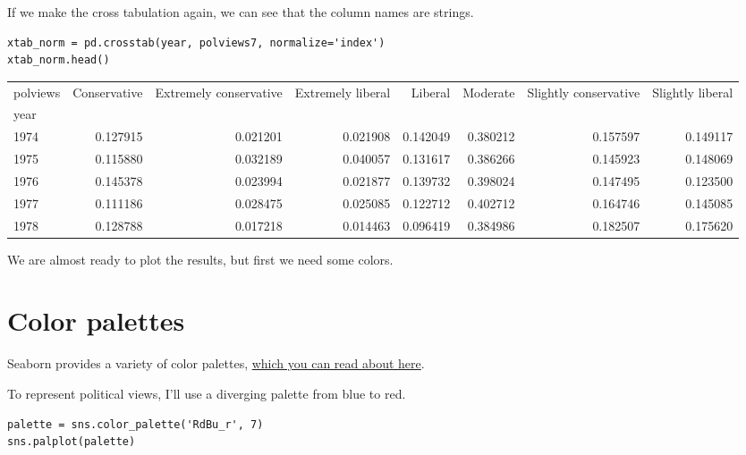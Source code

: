 If we make the cross tabulation again, we can see that the column names
are strings.

\begin{lstlisting}[]
xtab_norm = pd.crosstab(year, polviews7, normalize='index')
xtab_norm.head()
\end{lstlisting}

\begin{tabular}{lrrrrrrr}
\midrule
polviews &  Conservative &  Extremely conservative &  Extremely liberal &   Liberal &  Moderate &  Slightly conservative &  Slightly liberal \\
year &               &                         &                    &           &           &                        &                   \\
\midrule
1974 &      0.127915 &                0.021201 &           0.021908 &  0.142049 &  0.380212 &               0.157597 &          0.149117 \\
1975 &      0.115880 &                0.032189 &           0.040057 &  0.131617 &  0.386266 &               0.145923 &          0.148069 \\
1976 &      0.145378 &                0.023994 &           0.021877 &  0.139732 &  0.398024 &               0.147495 &          0.123500 \\
1977 &      0.111186 &                0.028475 &           0.025085 &  0.122712 &  0.402712 &               0.164746 &          0.145085 \\
1978 &      0.128788 &                0.017218 &           0.014463 &  0.096419 &  0.384986 &               0.182507 &          0.175620 \\
\midrule
\end{tabular}

We are almost ready to plot the results, but first we need some colors.

\hypertarget{color-palettes}{%
\section{Color palettes}\label{color-palettes}}

Seaborn provides a variety of color palettes,
\href{https://seaborn.pydata.org/tutorial/color_palettes.html}{which you
can read about here}.

To represent political views, I'll use a diverging palette from blue to
red.

\begin{lstlisting}[]
palette = sns.color_palette('RdBu_r', 7)
sns.palplot(palette)
\end{lstlisting}

